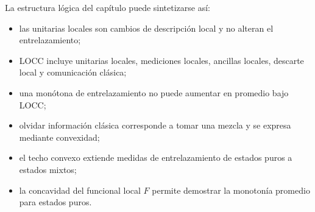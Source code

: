 \documentclass[../main.tex]{subfiles}
\begin{document}
La estructura lógica del capítulo puede sintetizarse así:
\begin{itemize}
    \item las unitarias locales son cambios de descripción local y no alteran el entrelazamiento;
    \item LOCC incluye unitarias locales, mediciones locales, ancillas locales, descarte local y comunicación clásica;
    \item una monótona de entrelazamiento no puede aumentar en promedio bajo LOCC;
    \item olvidar información clásica corresponde a tomar una mezcla y se expresa mediante convexidad;
    \item el techo convexo extiende medidas de entrelazamiento de estados puros a estados mixtos;
    \item la concavidad del funcional local \(F\) permite demostrar la monotonía promedio para estados puros.
\end{itemize}
\end{document}
